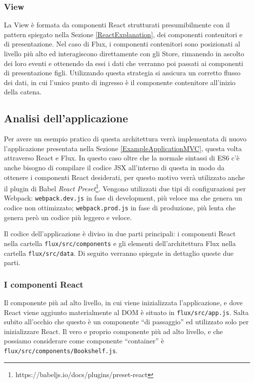 \subsubsection*{View}
La View è formata da componenti React strutturati presumibilmente con il pattern spiegato nella Sezione \ref{ReactExplanation}, dei componenti contenitori e di presentazione. Nel caso di Flux, i componenti contenitori sono posizionati al livello più alto ed interagiscono direttamente con gli Store, rimanendo in ascolto dei loro eventi e ottenendo da essi i dati che verranno poi passati ai componenti di presentazione figli.
Utilizzando questa strategia si assicura un corretto flusso dei dati, in cui l'unico punto di ingresso è il componente contenitore all'inizio della catena.

\subsection{Analisi dell'applicazione}
\label{FluxApplication}
Per avere un esempio pratico di questa architettura verrà implementata di nuovo l'applicazione presentata nella Sezione \ref{ExampleApplicationMVC}, questa volta attraverso React e Flux.
In questo caso oltre che la normale sintassi di ES6 c'è anche bisogno di compilare il codice JSX all'interno di questa in modo da ottenere i componenti React desiderati, per questo motivo verrà utilizzato anche il plugin di Babel \textit{React Preset}\footnote{https://babeljs.io/docs/plugins/preset-react}.
Vengono utilizzati due tipi di configurazioni per Webpack: \texttt{webpack.dev.js} in fase di development, più veloce ma che genera un codice non ottimizzato; \texttt{webpack.prod.js} in fase di produzione, più lenta che genera però un codice più leggero e veloce.

Il codice dell'applicazione è diviso in due parti principali: i componenti React nella cartella \texttt{flux/src/components} e gli elementi dell'architettura Flux nella cartella \texttt{flux/src/data}. Di seguito verranno spiegate in dettaglio queste due parti.

\subsubsection*{I componenti React}
Il componente più ad alto livello, in cui viene inizializzata l'applicazione, e dove React viene aggiunto materialmente al DOM è situato in \texttt{flux/src/app.js}. Salta subito all'occhio che questo è un componente “di passaggio” ed utilizzato solo per inizializzare React. Il vero e proprio componente più ad alto livello, e che possiamo considerare come componente “container” è \texttt{flux/src/components/Bookshelf.js}.

